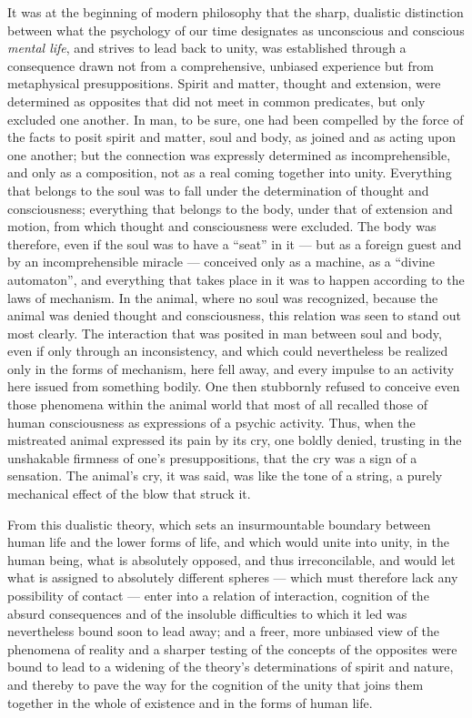 \documentclass[12pt,a4paper,openany]{book}
\newcommand{\opage}[1]{\marginnote{\footnotesize\textit{[#1]}}}
\begin{document}
It was at the beginning of modern philosophy that the sharp,
dualistic distinction between what the psychology of our time
designates as unconscious and conscious \emph{mental life},
and strives to lead back to unity, was established through a
consequence drawn not from a comprehensive, unbiased experience
but from metaphysical presuppositions. Spirit and matter,
thought and extension, were determined as opposites that did not
meet in common predicates, but only excluded one another.
In man, to be sure, one had been compelled by the force of the facts
to posit spirit and matter, soul and body, as joined and as acting
upon one another; but the connection was expressly determined as
incomprehensible, and only as a composition, not as a real coming
together into unity. Everything that belongs to the soul was to
fall under the determination of thought and consciousness; everything
that belongs to the body, under that of extension and motion, from
which thought and consciousness were excluded. The body was therefore,
even if the soul was to have a ``seat'' in it --- but as a foreign
guest and by an incomprehensible miracle --- conceived only as a
machine, as a ``divine automaton'', and everything that takes place
in it was to happen according to the laws of mechanism. In the animal,
where no soul was recognized, because the animal was denied thought
and consciousness, this relation was seen to stand out most clearly.
The interaction that was posited in man between soul and body, even
if only through an inconsistency, and which could nevertheless be
realized only in the forms of mechanism, here fell away, and every
impulse to an activity here issued from something bodily. One then
stubbornly refused to conceive even those phenomena within the animal
world that most of all recalled those of human consciousness as
expressions of a psychic activity. Thus, when the mistreated animal
expressed its pain by its cry, one boldly denied, trusting in the
unshakable firmness of one's
\opage{44}presuppositions, that the cry was a sign of a sensation.
The animal's cry, it was said, was like the tone of a string,
a purely mechanical effect of the blow that struck it.

From this dualistic theory, which sets an insurmountable boundary
between human life and the lower forms of life, and which would unite
into unity, in the human being, what is absolutely opposed, and thus
irreconcilable, and would let what is assigned to absolutely different
spheres --- which must therefore lack any possibility of contact ---
enter into a relation of interaction, cognition of the absurd
consequences and of the insoluble difficulties to which it led was
nevertheless bound soon to lead away; and a freer, more unbiased view
of the phenomena of reality and a sharper testing of the concepts of
the opposites were bound to lead to a widening of the theory's
determinations of spirit and nature, and thereby to pave the way for
the cognition of the unity that joins them together in the whole of
existence and in the forms of human life.
\end{document}
